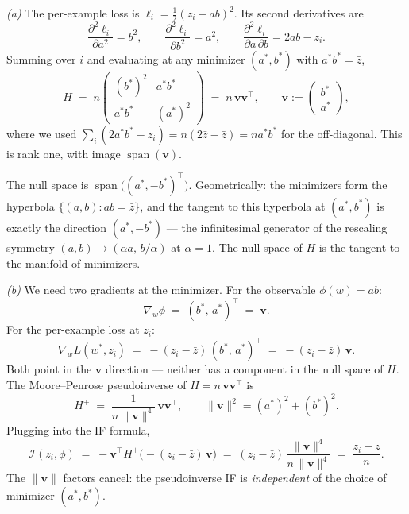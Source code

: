 \documentclass[11pt]{article}
\begin{document}
\begin{solution}[ex:ols-if]
\end{solution}

\begin{solution}[ex:if-degenerate]

\textit{(a)} The per-example loss is $\ell_i = \tfrac12(z_i - ab)^2$. Its second derivatives are
\[
  \frac{\partial^2 \ell_i}{\partial a^2} = b^2,
  \qquad
  \frac{\partial^2 \ell_i}{\partial b^2} = a^2,
  \qquad
  \frac{\partial^2 \ell_i}{\partial a\,\partial b} = 2ab - z_i.
\]
Summing over $i$ and evaluating at any minimizer $(a^*,b^*)$ with $a^*b^* = \bar z$,
\[
  H \;=\; n\begin{pmatrix} (b^*)^2 & a^*b^* \\ a^*b^* & (a^*)^2 \end{pmatrix}
  \;=\; n\,\mathbf{v}\mathbf{v}^\top,
  \qquad \mathbf{v} := \begin{pmatrix}b^*\\a^*\end{pmatrix},
\]
where we used $\sum_i(2a^*b^* - z_i) = n(2\bar z - \bar z) = na^*b^*$ for the off-diagonal. This is rank one, with image $\operatorname{span}(\mathbf{v})$.

The null space is $\operatorname{span}\bigl((a^*,-b^*)^\top\bigr)$. Geometrically: the minimizers form the hyperbola $\{(a,b): ab = \bar z\}$, and the tangent to this hyperbola at $(a^*,b^*)$ is exactly the direction $(a^*,-b^*)$ --- the infinitesimal generator of the rescaling symmetry $(a,b)\to(\alpha a,\, b/\alpha)$ at $\alpha=1$. The null space of $H$ is the tangent to the manifold of minimizers.

\textit{(b)} We need two gradients at the minimizer. For the observable $\phi(w) = ab$:
\[
  \nabla_w\phi \;=\; (b^*,\,a^*)^\top \;=\; \mathbf{v}.
\]
For the per-example loss at $z_i$:
\[
  \nabla_w L(w^*,z_i) \;=\; -(z_i - \bar z)\,(b^*,\,a^*)^\top \;=\; -(z_i - \bar z)\,\mathbf{v}.
\]
Both point in the $\mathbf{v}$ direction --- neither has a component in the null space of $H$. The Moore--Penrose pseudoinverse of $H = n\,\mathbf{v}\mathbf{v}^\top$ is
\[
  H^+ \;=\; \frac{1}{n\,\|\mathbf{v}\|^4}\,\mathbf{v}\mathbf{v}^\top,
  \qquad \|\mathbf{v}\|^2 = (a^*)^2 + (b^*)^2.
\]
Plugging into the IF formula,
\[
  \mathcal{I}(z_i,\phi)
  \;=\; -\mathbf{v}^\top H^+\bigl(-(z_i-\bar z)\,\mathbf{v}\bigr)
  \;=\; (z_i - \bar z)\,\frac{\|\mathbf{v}\|^4}{n\,\|\mathbf{v}\|^4}
  \;=\; \frac{z_i - \bar z}{n}.
\]
The $\|\mathbf{v}\|$ factors cancel: the pseudoinverse IF is \emph{independent} of the choice of minimizer $(a^*,b^*)$.


\end{solution}
\end{document}

